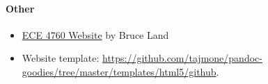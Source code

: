 \documentclass[]{article}
\providecommand{\tightlist}{%
  \setlength{\itemsep}{0pt}\setlength{\parskip}{0pt}}
\let\oldparagraph\paragraph
\renewcommand{\paragraph}[1]{\oldparagraph{#1}\mbox{}}
\begin{document}
\hypertarget{other}{%
\paragraph{Other}\label{other}}

\begin{itemize}
\tightlist
\item
  \href{http://people.ece.cornell.edu/land/courses/ece4760/}{ECE 4760
  Website} by Bruce Land
\item
  Website template:
  \url{https://github.com/tajmone/pandoc-goodies/tree/master/templates/html5/github}.
\end{itemize}
\end{document}
